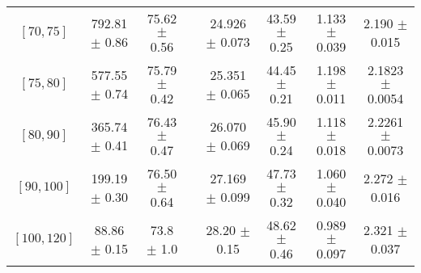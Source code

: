 \begin{tabular}{c||c|c|c|c|c|c|c}
$[70, 75]$ & 792.81 $\pm$ 0.86 & 75.62 $\pm$ 0.56 &  & 24.926 $\pm$ 0.073 & 43.59 $\pm$ 0.25 & 1.133 $\pm$ 0.039 & 2.190 $\pm$ 0.015\\
$[75, 80]$ & 577.55 $\pm$ 0.74 & 75.79 $\pm$ 0.42 &  & 25.351 $\pm$ 0.065 & 44.45 $\pm$ 0.21 & 1.198 $\pm$ 0.011 & 2.1823 $\pm$ 0.0054\\
$[80, 90]$ & 365.74 $\pm$ 0.41 & 76.43 $\pm$ 0.47 &  & 26.070 $\pm$ 0.069 & 45.90 $\pm$ 0.24 & 1.118 $\pm$ 0.018 & 2.2261 $\pm$ 0.0073\\
$[90, 100]$ & 199.19 $\pm$ 0.30 & 76.50 $\pm$ 0.64 &  & 27.169 $\pm$ 0.099 & 47.73 $\pm$ 0.32 & 1.060 $\pm$ 0.040 & 2.272 $\pm$ 0.016\\
$[100, 120]$ & 88.86 $\pm$ 0.15 & 73.8 $\pm$ 1.0 &  & 28.20 $\pm$ 0.15 & 48.62 $\pm$ 0.46 & 0.989 $\pm$ 0.097 & 2.321 $\pm$ 0.037\\
\end{tabular}
